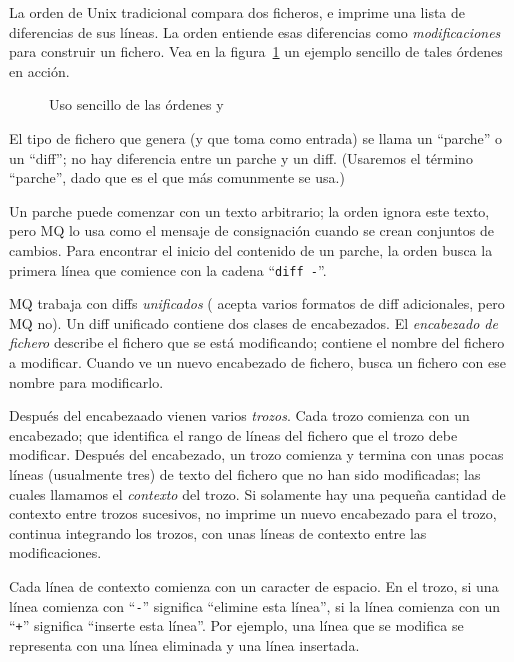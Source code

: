 La orden de Unix tradicional  compara dos ficheros, e
imprime una lista de diferencias de sus líneas.  La orden
 entiende esas diferencias como \emph{modificaciones}
para construir un fichero.  Vea en la figura~\ref{ex:mq:diff} un
ejemplo sencillo de tales órdenes en acción.

\begin{figure}[ht]
  \caption{Uso sencillo de las órdenes  y }
  \label{ex:mq:diff}
\end{figure}

El tipo de fichero que  genera (y que 
toma como entrada) se llama un ``parche'' o un ``diff''; no hay
diferencia entre un parche y un diff.  (Usaremos el término ``parche'',
dado que es el que más comunmente se usa.)

Un parche puede comenzar con un texto arbitrario; la orden 
ignora este texto, pero MQ lo usa como el mensaje de consignación
cuando se crean conjuntos de cambios.  Para encontrar el inicio del
contenido de un parche, la orden  busca la primera
línea que comience con la cadena ``\texttt{diff~-}''.

MQ trabaja con diffs \emph{unificados} ( acepta varios
formatos de diff adicionales, pero MQ no).  Un diff unificado contiene
dos clases de encabezados.  El \emph{encabezado de fichero} describe
el fichero que se está modificando; contiene el nombre del fichero a
modificar.  Cuando  ve un nuevo encabezado de fichero,
busca un fichero con ese nombre para modificarlo.

Después del encabezaado vienen varios \emph{trozos}.  Cada trozo
comienza con un encabezado; que identifica el rango de líneas del
fichero que el trozo debe modificar.  Después del encabezado, un trozo
comienza y termina con unas pocas líneas (usualmente tres) de texto del
fichero que no han sido modificadas; las cuales llamamos el
\emph{contexto} del trozo.  Si solamente hay una pequeña cantidad de
contexto entre trozos sucesivos,  no imprime un nuevo
encabezado para el trozo, continua integrando los trozos, con unas
líneas de contexto entre las modificaciones.

Cada línea de contexto comienza con un caracter de espacio.  En el
trozo, si una línea comienza con ``\texttt{-}'' significa ``elimine
esta línea'', si la línea comienza con un ``\texttt{+}'' significa
``inserte esta línea''.  Por ejemplo, una línea que se modifica se
representa con una línea eliminada y una línea insertada.

